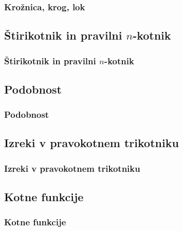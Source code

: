         \begin{frame}
            \frametitle{Krožnica, krog, lok}
        \end{frame}

    \subsection{Štirikotnik in pravilni $n$-kotnik}

        \begin{frame}
            \frametitle{Štirikotnik in pravilni $n$-kotnik}
        \end{frame}

    \subsection{Podobnost}

        \begin{frame}
            \frametitle{Podobnost}
        \end{frame}

    \subsection{Izreki v pravokotnem trikotniku}

        \begin{frame}
            \frametitle{Izreki v pravokotnem trikotniku}
        \end{frame}

    \subsection{Kotne funkcije}

        \begin{frame}
            \frametitle{Kotne funkcije}
        \end{frame}

